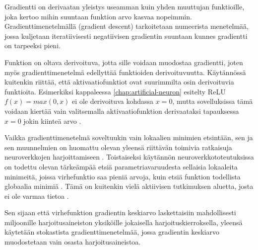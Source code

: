 \documentclass[finnish]{tktltiki2}
\theoremstyle{definition}
\theoremstyle{remark}
\begin{document}
    Gradientti on derivaatan yleistys useamman kuin yhden muuttujan funktioille, joka kertoo mihin suuntaan funktion arvo kasvaa nopeimmin. Gradienttimenetelmällä (gradient descent) tarkoitetaan numeerista menetelmää, jossa kuljetaan iteratiivisesti negatiivisen gradientin suuntaan kunnes gradientti on tarpeeksi pieni. 

    Funktion on oltava derivoituva, jotta sille voidaan muodostaa gradientti, joten myös gradienttimenetelmä edellyttää funktioiden derivoituvuutta. Käytännössä kuitenkin riittää, että aktivaatiofunktiot ovat suurimmilta osin derivoituvia funktioita. 
    Esimerkiksi kappaleessa \ref{chap:artificial-neuron} esitelty ReLU $f(x) = max(0, x)$ ei ole derivoituva kohdassa $x = 0$, mutta sovelluksissa tämä voidaan kiertää vain valitsemalla aktivaatiofunktion derivaataksi tapauksessa $x=0$ jokin kiinteä arvo \cite{Goodfellow-et-al-2016}.
    

    Vaikka gradienttimenetelmä soveltuukin vain lokaalien minimien etsintään, sen ja sen muunnelmien on huomattu olevan yleensä riittävän toimivia ratkaisuja neuroverkkojen harjoittamiseen \cite{Rumelhart-1986-back-prop}\cite{Goodfellow-et-al-2016}. Toistaiseksi käytännön neuroverkkototeutuksissa on todettu olevan tärkeämpää etsiä parametriavaruudesta sellaisia lokaaleita minimeitä, joissa virhefunktio saa pieniä arvoja, kuin etsiä funktion todellista globaalia minimiä \cite{neural-optimization-goodfellow-2015}. Tämä on kuitenkin vielä aktiivisen tutkimuksen aluetta, josta ei ole varmaa tietoa \cite{Goodfellow-et-al-2016}.

    Sen sijaan että virhefunktion gradientin keskiarvo laskettaisiin mahdollisesti miljoonille harjoitusaineiston yksiköille jokaisella harjoituskierroksella, yleensä käytetään stokastista gradienttimenetelmää, jossa gradientin keskiarvo muodostetaan vain osasta harjoitusaineistoa. 
\end{document}
